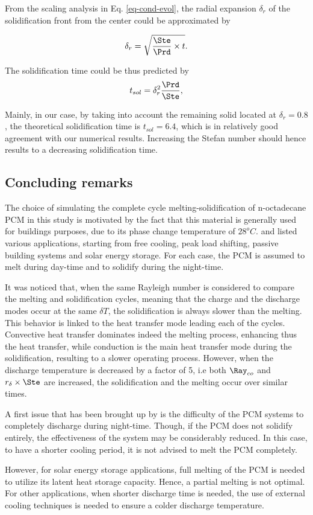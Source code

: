 From the scaling analysis in Eq. \ref{eq-cond-evol}, the radial expansion $\delta_r$ of the solidification front from the center could be approximated by

\begin{equation}
	\delta_r = \sqrt{\frac{\Ste}{\Prd}\times t}.
\end{equation}

\noindent The solidification time could be thus predicted by
\begin{equation}
	t_{sol} = \delta_r^2 \frac{\Prd}{\Ste},
\end{equation}

\noindent Mainly, in our case, by taking into account the remaining solid located at $\delta_r = 0.8$, the theoretical solidification time is $t_{sol} = 6.4$, which is in relatively good agreement with our numerical results.
Increasing the Stefan number should hence results to a decreasing solidification time.


\subsection{Concluding remarks}
The choice of simulating the complete cycle melting-solidification of n-octadecane PCM in this study is motivated by the fact that this material is generally used for buildings purposes, due to its phase change temperature of  $28^{o}C$.
\cite{zhu2009dynamic} and \cite{kalnaes2015phase} listed various applications, starting from free cooling, peak load shifting, passive building systems and solar energy storage.
For each case, the PCM is assumed to melt during day-time and to solidify during the night-time.

It was noticed that, when the same Rayleigh number is considered to compare the melting and solidification cycles, meaning that the charge and the discharge modes occur at the same $\delta T$, the solidification is always slower than the melting. 
This behavior is linked to the heat transfer mode leading each of the cycles. 
Convective heat transfer dominates indeed the melting process, enhancing thus the heat transfer, while conduction is the main heat transfer mode during the solidification, resulting to a slower operating process.
However, when the discharge temperature is decreased by a factor of 5, i.e both $\Ray_{co}$ and $r_{\delta} \times \Ste$ are increased, the solidification and the melting occur over similar times.

A first issue that has been brought up by \cite{ascione2014energy} is the difficulty of the PCM systems to completely discharge during night-time.
Though, if the PCM does not solidify entirely, the effectiveness of the system may be considerably reduced.
In this case, to have a shorter cooling period, it is not advised to melt the PCM completely.

However, for solar energy storage applications, full melting of the PCM is needed to utilize its latent heat storage capacity.
Hence, a partial melting is not optimal.  For other applications, when shorter discharge time is needed, the use of external cooling techniques is needed to ensure a colder discharge temperature.
